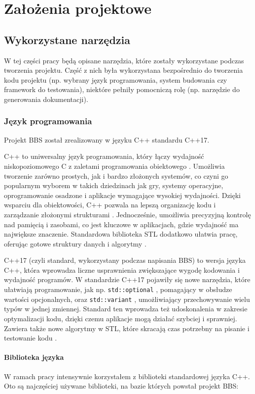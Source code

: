 \chapter{Założenia projektowe}
\section{Wykorzystane narzędzia}
W tej części pracy będą opisane narzędzia, które zostały wykorzystane podczas tworzenia projektu. Część z nich była wykorzystana bezpośrednio do tworzenia kodu projektu (np. wybrany język programowania, system budowania czy framework do testowania), niektóre pełniły pomocniczą rolę (np. narzędzie do generowania dokumentacji).

\subsection{Język programowania}
Projekt BBS został zrealizowany w języku C++ standardu C++17.

C++ to uniwersalny język programowania, który łączy wydajność niskopoziomowego C z zaletami programowania obiektowego \cite{cpp}. Umożliwia tworzenie zarówno prostych, jak i bardzo złożonych systemów, co czyni go popularnym wyborem w takich dziedzinach jak gry, systemy operacyjne, oprogramowanie osadzone i aplikacje wymagające wysokiej wydajności. Dzięki wsparciu dla obiektowości, C++ pozwala na lepszą organizację kodu i zarządzanie złożonymi strukturami \cite{oop}. Jednocześnie, umożliwia precyzyjną kontrolę nad pamięcią i zasobami, co jest kluczowe w aplikacjach, gdzie wydajność ma największe znaczenie. Standardowa biblioteka STL dodatkowo ułatwia pracę, oferując gotowe struktury danych i algorytmy \cite{cpp_reference}.

C++17 (czyli standard, wykorzystany podczas napisania BBS) to wersja języka C++, która wprowadza liczne usprawnienia zwiększające wygodę kodowania i wydajność programów. W standardzie C++17 pojawiły się nowe narzędzia, które ułatwiają programowanie, jak np. \texttt{std::optional} \cite{cpp_optional}, pomagający w obsłudze wartości opcjonalnych, oraz \texttt{std::variant} \cite{cpp_variant}, umożliwiający przechowywanie wielu typów w jednej zmiennej. Standard ten wprowadza też udoskonalenia w zakresie optymalizacji kodu, dzięki czemu aplikacje mogą działać szybciej i sprawniej. Zawiera także nowe algorytmy w STL, które skracają czas potrzebny na pisanie i testowanie kodu \cite{cpp17,cpp17_guide}.

\subsubsection{Biblioteka języka}
W ramach pracy intensywnie korzystałem z biblioteki standardowej języka C++. Oto są najczęściej używane biblioteki, na bazie których powstał projekt BBS:

